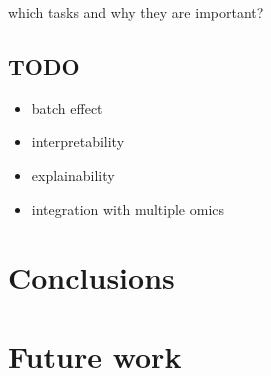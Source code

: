 \documentclass[12pt, a4paper]{article}
\begin{document}
which tasks and why they are important?

\subsection{TODO}

\begin{itemize}
    \item batch effect
    \item interpretability
    \item explainability
    \item integration with multiple omics
\end{itemize}

\section{Conclusions}

\section{Future work}


%

\appendix





\end{document}
